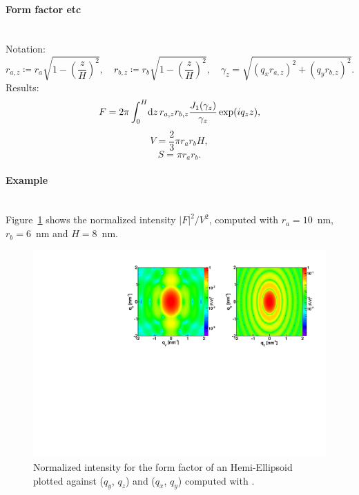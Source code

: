 \paragraph{Form factor etc}\strut\\
Notation:
\begin{equation*}
 r_{a,z} \coloneqq r_a \sqrt{1-\left(\dfrac{z}{H} \right)^2},\quad
 r_{b,z} \coloneqq r_b \sqrt{1-\left(\dfrac{z}{H} \right)^2}, \quad
 \gamma_z =\sqrt{(q_x r_{a,z})^2+(q_y r_{b,z})^2}.
\end{equation*}
Results:
\begin{equation*}
  F = 2\pi \int_0^{H} \!\text{d} z\, r_{a,z} r_{b,z}
                               \frac{J_1(\gamma_z)}{\gamma_z}\exp(iq_z z),
\end{equation*}
\begin{equation*}
  V = \dfrac{2}{3}\pi r_a r_bH,
\end{equation*}
\begin{equation*}
  S =\pi r_a r_b.
\end{equation*}

\paragraph{Example}\strut\\
Figure~\ref{fig:FFhemiellipsEx} shows the normalized intensity
$|F|^2/V^2$, computed with $r_a=10$~nm, $r_b=6$~nm and $H=8$~nm.

\begin{figure}[h]
\begin{center}
\includegraphics[angle=-90,width=\textwidth]{fig/ff/figffhemiellips.pdf}
\end{center}
\caption{Normalized intensity for the form factor of an Hemi-Ellipsoid plotted against ($q_y$, $q_z$) and  ($q_x$, $q_y$)
  computed with .}
\label{fig:FFhemiellipsEx}
\end{figure}

